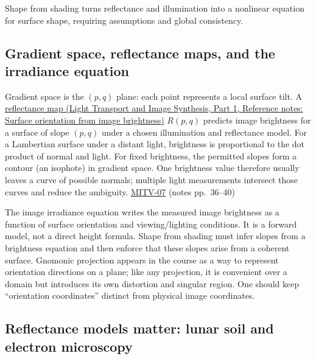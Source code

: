 \hypertarget{04-visual-computing-ii-ch032-shape-from-shading-and-reflectance}{}

Shape from shading turns reflectance and illumination into a nonlinear equation for surface shape, requiring assumptions and global consistency.

\subsection{Gradient space, reflectance maps, and the irradiance equation}\label{04-visual-computing-ii-ch032-gradient-space-reflectance-maps-and-the-irradiance-equation}

\hypertarget{04-visual-computing-ii-ch032-gradient-space-reflectance-maps-and-the-irradiance-equation}{}

Gradient space is the \((p,q)\) plane: each point represents a local surface tilt. A \href{../04-Light-Transport-and-Image-Synthesis-P01/main.pdf\#nameddest=appendix-89b2d5b7c9e1}{reflectance map (Light Transport and Image Synthesis, Part 1, Reference notes: Surface orientation from image brightness)} \(R(p,q)\) predicts image brightness for a surface of slope \((p,q)\) under a chosen illumination and reflectance model. For a Lambertian surface under a distant light, brightness is proportional to the dot product of normal and light. For fixed brightness, the permitted slopes form a contour (an isophote) in gradient space. One brightness value therefore usually leaves a curve of possible normals; multiple light measurements intersect those curves and reduce the ambiguity. \hyperref[04-visual-computing-ii-ch036-mitv-07---gradient-space-reflectance-map-image-irradiance-equation-gnomonic-projection]{MITV-07} (notes pp.~36--40)

The image irradiance equation writes the measured image brightness as a function of surface orientation and viewing/lighting conditions. It is a forward model, not a direct height formula. Shape from shading must infer slopes from a brightness equation and then enforce that these slopes arise from a coherent surface. Gnomonic projection appears in the course as a way to represent orientation directions on a plane; like any projection, it is convenient over a domain but introduces its own distortion and singular region. One should keep ``orientation coordinates'' distinct from physical image coordinates.

\subsection{Reflectance models matter: lunar soil and electron microscopy}\label{04-visual-computing-ii-ch032-reflectance-models-matter-lunar-soil-and-electron-microscopy}

